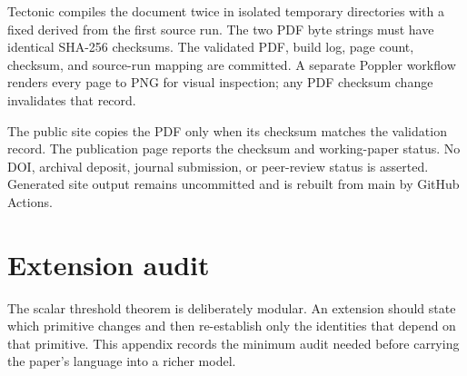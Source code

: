 \documentclass[11pt]{article}
\begin{document}
Tectonic compiles the document twice in isolated temporary directories with a
fixed  derived from the first source run. The two PDF
byte strings must have identical SHA-256 checksums. The validated PDF, build
log, page count, checksum, and source-run mapping are committed. A separate
Poppler workflow renders every page to PNG for visual inspection; any PDF
checksum change invalidates that record.

The public site copies the PDF only when its checksum matches the validation
record. The publication page reports the checksum and working-paper status. No
DOI, archival deposit, journal submission, or peer-review status is asserted.
Generated site output remains uncommitted and is rebuilt from main by GitHub
Actions.

\section{Extension audit}

The scalar threshold theorem is deliberately modular. An extension should state
which primitive changes and then re-establish only the identities that depend on
that primitive. This appendix records the minimum audit needed before carrying
the paper's language into a richer model.
\end{document}
